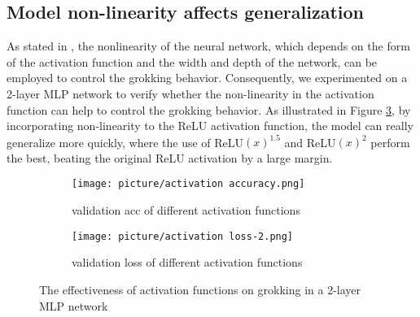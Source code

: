 \documentclass{article}
\begin{document}
\vspace{-1em}
\subsection{Model non-linearity affects generalization}
\vspace{-1em}
As stated in \cite{salah2024controlling}, the nonlinearity of the neural network, which depends on the form of the activation function and the width and depth of the network, can be employed to control the grokking behavior. Consequently, we experimented on a 2-layer MLP network to verify whether the non-linearity in the activation function can help to control the grokking behavior. As illustrated in Figure \ref{fig9:main}, by incorporating non-linearity to the ReLU activation function, the model can really generalize more quickly, where the use of ReLU$(x)^{1.5}$ and ReLU$(x)^2$ perform the best, beating the original ReLU activation by a large margin. 
\begin{figure}[htbp]
  \centering
   \begin{subfigure}[b]{0.33\textwidth}
        \centering
    \texttt{[image: picture/activation accuracy.png]}
    \caption{validation acc of different activation functions}
    \label{fig9:sub1}
  \end{subfigure}
  \hspace{1em} %
     \begin{subfigure}[b]{0.33\textwidth}
        \centering
    \texttt{[image: picture/activation loss-2.png]}
    \caption{validation loss of different activation functions      }
    \label{fig9:sub2}
  \end{subfigure}
 
  
  \renewcommand{\figurename}{Figure}
  \caption{The effectiveness of activation functions on grokking in a 2-layer MLP network}
  \label{fig9:main}
\end{figure}

\renewcommand{\refname}{Reference}










 





\end{document}

